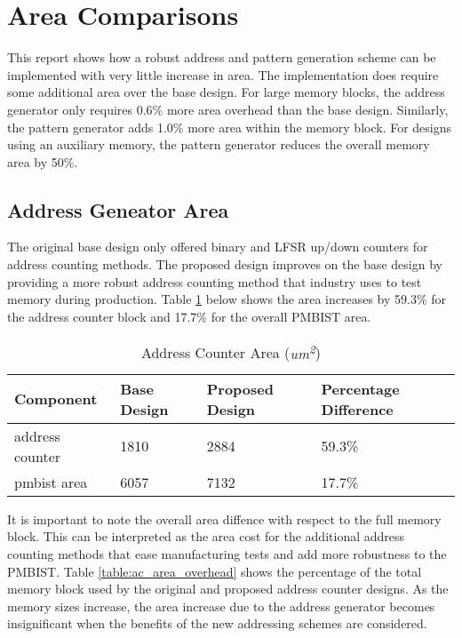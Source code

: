 \section{Area Comparisons}
This report shows how a robust address and pattern generation scheme can be implemented with very little increase in area.  The implementation does require some additional area over the base design.  For large memory blocks, the address generator only requires 0.6\% more area overhead than the base design.  Similarly, the pattern generator adds 1.0\% more area within the memory block.  For designs using an auxiliary memory, the pattern generator reduces the overall memory area by 50\%.  

\label{sect:cln-area}
\subsection{Address Geneator Area}
The original base design only offered binary and LFSR up/down counters for address counting methods.  The proposed design improves on the base design by providing a more robust address counting method that industry uses to test memory during production.  Table \ref{table:ac_area_compare} below shows the area increases by  59.3\% for the address counter block and 17.7\% for the overall PMBIST area.  

\begin{table}[ht]
\caption{Address Counter Area (\textit{um\textsuperscript{2}})}
\centering
\begin{tabular}{| l | l | l | l |}
\hline
Component & Base Design & Proposed Design & Percentage Difference \\ [0.5ex]
\hline\hline
address counter & 1810   & 2884   & 59.3\% \\
pmbist area     & 6057   & 7132   & 17.7\% \\ 
\hline
\end{tabular}
\label{table:ac_area_compare}
\end{table}

It is important to note the overall area diffence with respect to the full memory block.  This can be interpreted as the area cost for the additional address counting methods that ease manufacturing tests and add more robustness to the PMBIST.  Table \ref{table:ac_area_overhead} shows the percentage of the total memory block used by the original and proposed address counter designs.  As the memory sizes increase, the area increase due to the address generator becomes insignificant when the benefits of the new addressing schemes are considered.   

